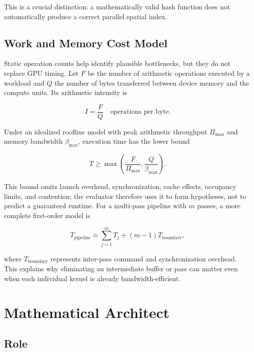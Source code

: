 \documentclass[11pt,a4paper,oneside]{report}
\begin{document}
This is a crucial distinction: a mathematically valid hash function does not automatically
produce a correct parallel spatial index.

\section{Work and Memory Cost Model}

Static operation counts help identify plausible bottlenecks, but they do not replace GPU timing.
Let $F$ be the number of arithmetic operations executed by a workload and $Q$ the number of bytes
transferred between device memory and the compute units. Its arithmetic intensity is

\begin{equation}
I=\frac{F}{Q}
\quad\text{operations per byte}.
\end{equation}

Under an idealized roofline model with peak arithmetic throughput $\Pi_{\max}$ and memory
bandwidth $\beta_{\max}$, execution time has the lower bound

\begin{equation}
T\ge \max\left(\frac{F}{\Pi_{\max}},\frac{Q}{\beta_{\max}}\right).
\end{equation}

This bound omits launch overhead, synchronization, cache effects, occupancy limits, and contention;
the evaluator therefore uses it to form hypotheses, not to predict a guaranteed runtime. For a
multi-pass pipeline with $m$ passes, a more complete first-order model is

\begin{equation}
T_{\mathrm{pipeline}}\approx
\sum_{j=1}^{m}T_j+(m-1)T_{\mathrm{boundary}},
\end{equation}

where $T_{\mathrm{boundary}}$ represents inter-pass command and synchronization overhead. This
explains why eliminating an intermediate buffer or pass can matter even when each individual
kernel is already bandwidth-efficient.

\chapter{Mathematical Architect}

\section{Role}
\end{document}
